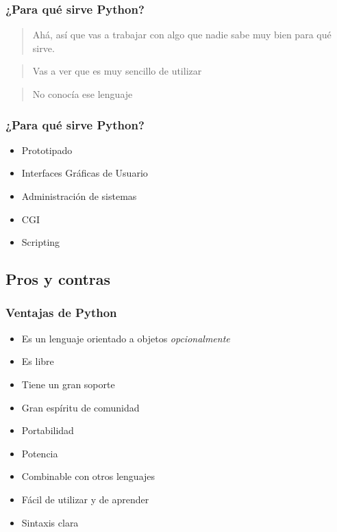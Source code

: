 \documentclass{beamer}
\begin{document}
\begin{frame}
\frametitle{¿Para qué sirve Python?}
\begin{block}{}
\begin{quote}
Ahá, así que vas a trabajar con algo que nadie sabe muy bien para qué sirve.
\end{quote}
\end{block}
\begin{block}{}
\begin{quote}
Vas a ver que es muy sencillo de utilizar
\end{quote}
\end{block}
\begin{block}{}
\begin{quote}
No conocía ese lenguaje
\end{quote}
\end{block}
\end{frame}


\begin{frame}
\frametitle{¿Para qué sirve Python?}
\begin{itemize}
	\item Prototipado
	\item Interfaces Gráficas de Usuario
	\item Administración de sistemas
	\item CGI
	\item Scripting
\end{itemize}
\end{frame}

\subsection{Pros y contras}
\begin{frame}
\frametitle{Ventajas de Python}
\begin{itemize}
	\item Es un lenguaje orientado a objetos \textit{opcionalmente}
	\item Es libre
	\item Tiene un gran soporte
	\item Gran espíritu de comunidad
	\item Portabilidad
	\item Potencia
	\item Combinable con otros lenguajes
	\item Fácil de utilizar y de aprender
	\item Sintaxis clara
\end{itemize}
\end{frame}
\end{document}

